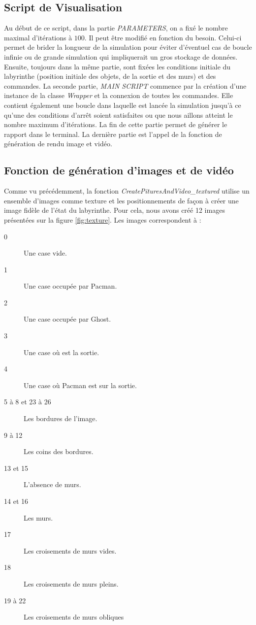 \subsection{Script de Visualisation}
Au début de ce script, dans la partie \emph{PARAMETERS}, on a fixé le nombre maximal d'itérations  à $100$.  Il peut être modifié en fonction du besoin. Celui-ci permet de brider la longueur de la simulation pour éviter d'éventuel cas de boucle infinie ou de grande simulation qui impliquerait un gros stockage de données. Ensuite, toujours dans la même partie, sont fixées les conditions initiale du labyrinthe (position initiale des objets, de la sortie et des murs) et des commandes. La seconde partie, \emph{MAIN SCRIPT} commence par la création d'une instance de la classe  \emph{Wrapper} et la connexion de toutes les commandes. Elle contient également une boucle dans laquelle est lancée la simulation jusqu'à ce qu'une des conditions d'arrêt soient satisfaites ou que nous aillons atteint le nombre maximum d'itérations. La fin de cette partie permet de générer le rapport dans le terminal. La dernière partie est l'appel de la fonction de génération de rendu image et vidéo.
\subsection{Fonction de génération d'images et de vidéo}
Comme vu précédemment, la fonction \emph{CreatePituresAndVideo\_textured} utilise un ensemble d'images comme texture et les positionnements de façon à créer une image fidèle de l'état du labyrinthe. Pour cela, nous avons créé 12 images présentées sur la figure \ref{fig:texture}.  Les images correspondent à :
\begin{description}
\item[0] Une case vide.
\item[1] Une case occupée par Pacman.
\item[2] Une case occupée par Ghost.
\item[3] Une case où est la sortie.
\item[4] Une case où Pacman est sur la sortie.
\item[5 à 8 et 23 à 26] Les bordures de l'image.
\item[9 à 12] Les coins des bordures.
\item[13 et 15] L'absence de murs.
\item[14 et 16] Les murs.
\item[17] Les croisements de murs vides.
\item[18] Les croisements de murs pleins.
\item[19 à 22] Les croisements de murs obliques
\end{description}

